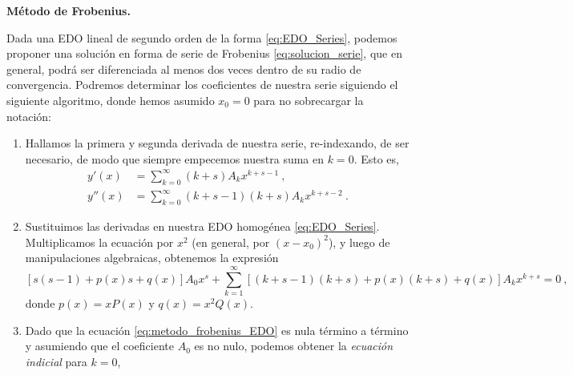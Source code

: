 \begin{propo} 
    \textbf{Método de Frobenius.}

    Dada una EDO lineal de segundo orden de la forma \eqref{eq:EDO_Series}, podemos proponer una solución en forma de serie de Frobenius \eqref{eq:solucion_serie}, que en general, podrá ser diferenciada al menos dos veces dentro de su radio de convergencia. Podremos determinar los coeficientes de nuestra serie siguiendo el siguiente algoritmo, donde hemos asumido $x_0 = 0$ para no sobrecargar la notación:
    \begin{enumerate}
        \item Hallamos la primera y segunda derivada de nuestra serie, re-indexando, de ser necesario, de modo que siempre empecemos nuestra suma en $k=0$. Esto es,
        \begin{align}
            y'(x)  & = \sum_{k=0}^\infty (k+s) A_k x^{k+s-1} 
            \ ,
            \\
            y''(x) & = \sum_{k=0}^\infty (k+s-1)(k+s) A_k x^{k+s-2} \ .
        \end{align}
        \item Sustituimos las derivadas en nuestra EDO homogénea \eqref{eq:EDO_Series}. Multiplicamos la ecuación por $x^2$ (en general, por $(x-x_0)^2$), y luego de manipulaciones algebraicas, obtenemos la expresión
        \begin{equation}\label{eq:metodo_frobenius_EDO}
            [s(s-1) + p(x)s + q(x)]A_0 x^s + \sum_{k=1}^\infty [(k+s-1)(k+s) + p(x)(k+s) + q(x)]A_k x^{k+s} = 0 \ ,
        \end{equation}
        donde $p(x) = xP(x)$ y $q(x) = x^2 Q(x)$.\footnotemark
        \item Dado que la ecuación \eqref{eq:metodo_frobenius_EDO} es nula término a término y asumiendo que el coeficiente $A_0$ es no nulo, podemos obtener la \emph{ecuación indicial} para $k=0$,
        \begin{equation} \label{eq:ecuacion_indicial}

\end{equation}
\end{enumerate}
\end{propo}
